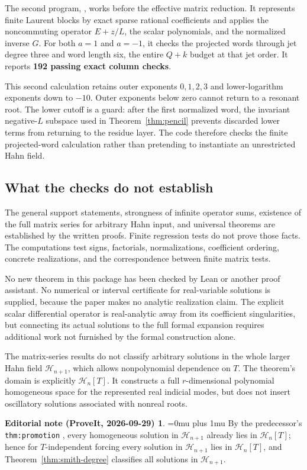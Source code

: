 \documentclass[11pt,a4paper]{article}
\numberwithin{equation}{section}
\theoremstyle{definition}
\theoremstyle{remark}
\theoremstyle{definition}
\newtheorem*{ednoteinner}{Editorial note (ProveIt, 2026-09-29)}
\newenvironment{ednote}{\begin{ednoteinner}\sloppy\Urlmuskip=0mu plus 1mu\relax}{\end{ednoteinner}}
\newcommand{\Hh}{\mathcal H}
\begin{document}
The second program, , works before the effective matrix reduction. It represents finite Laurent blocks by exact sparse rational coefficients and applies the noncommuting operator $E+z/L$, the scalar polynomials, and the normalized inverse $G$. For both $a=1$ and $a=-1$, it checks the projected words through jet degree three and word length six, the entire $Q+k$ budget at that jet order. It reports \textbf{192 passing exact column checks}.

This second calculation retains outer exponents $0,1,2,3$ and lower-logarithm exponents down to $-10$. Outer exponents below zero cannot return to a resonant root. The lower cutoff is a guard: after the first normalized word, the invariant negative-$L$ subspace used in Theorem~\ref{thm:pencil} prevents discarded lower terms from returning to the residue layer. The code therefore checks the finite projected-word calculation rather than pretending to instantiate an unrestricted Hahn field.

\subsection{What the checks do not establish}
The general support statements, strongness of infinite operator sums, existence of the full matrix series for arbitrary Hahn input, and universal theorems are established by the written proofs. Finite regression tests do not prove those facts. The computations test signs, factorials, normalizations, coefficient ordering, concrete realizations, and the correspondence between finite matrix tests.

No new theorem in this package has been checked by Lean or another proof assistant. No numerical or interval certificate for real-variable solutions is supplied, because the paper makes no analytic realization claim. The explicit scalar differential operator is real-analytic away from its coefficient singularities, but connecting its actual solutions to the full formal expansion requires additional work not furnished by the formal construction alone.

The matrix-series results do not classify arbitrary solutions in the whole larger Hahn field $\Hh_{n+1}$, which allows nonpolynomial dependence on $T$. The theorem's domain is explicitly $\Hh_n[T]$. It constructs a full $r$-dimensional polynomial homogeneous space for the represented real indicial modes, but does not insert oscillatory solutions associated with nonreal roots.
\begin{ednote}
By the predecessor's \texttt{thm:promotion} \cite{repo-residue}, every homogeneous solution in $\Hh_{n+1}$ already lies in $\Hh_n[T]$; hence for $T$-independent forcing every solution in $\Hh_{n+1}$ lies in $\Hh_n[T]$, and Theorem~\ref{thm:smith-degree} classifies all solutions in $\Hh_{n+1}$.
\end{ednote}
\end{document}

